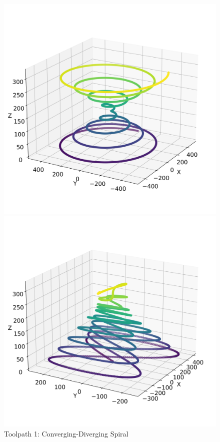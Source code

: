 \begin{figure}[H]%
	\centering
	\begin{minipage}{0.5\textwidth}
		\includegraphics[width=\textwidth]{figures/path1.png}
		\caption{Toolpath 1: Converging-Diverging Spiral}
		\label{path1}
	\end{minipage}\hfill
	\begin{minipage}{0.5\textwidth}
		\includegraphics[width=\textwidth]{figures/path2.png}

\end{minipage}
\end{figure}
